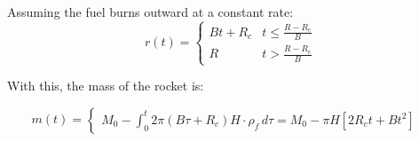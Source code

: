 \documentclass[12pt,a4paper]{article}
\begin{document}
Assuming the fuel burns outward at a constant rate:
\begin{equation}
r(t) = \begin{cases}
Bt + R_c & t \le \frac{R - R_c}{B} \\
R      & t > \frac{R - R_c}{B}
\end{cases}
\label{eq:inner-radius}
\end{equation}

With this, the mass of the rocket is:

\begin{equation}
m(t) = \begin{cases}M_0 - \int_0^t 2\pi (B\tau+R_c) H\cdot \rho_f\,d\tau = M_0 - \pi H \left[2R_c t + Bt^2\right] & 
\end{cases}
\label{eq:mass}
\end{equation}
\end{document}

